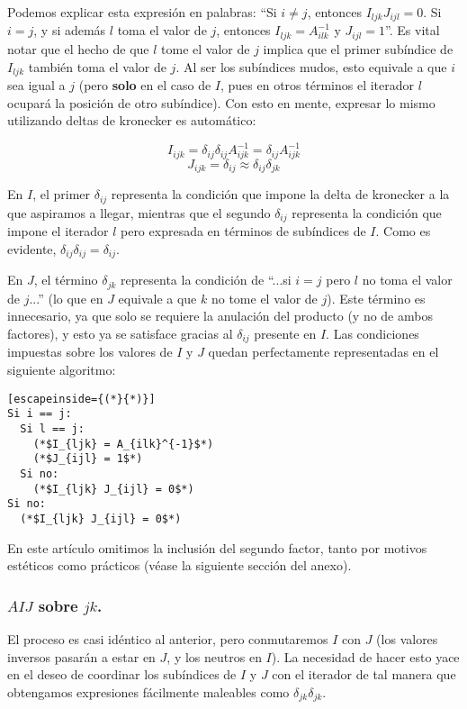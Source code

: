 Podemos explicar esta expresión en palabras: ``Si $i \neq j$, entonces $I_{ljk} J_{ijl} = 0$. Si $i = j$, y si además $l$ toma el valor de $j$, entonces $I_{ljk} = A^{-1}_{ilk}$ y $J_{ijl} = 1$''. Es vital notar que el hecho de que $l$ tome el valor de $j$ implica que el primer subíndice de $I_{ljk}$ también toma el valor de $j$. Al ser los subíndices mudos, esto equivale a que $i$ sea igual a $j$ (pero \textbf{solo} en el caso de $I$, pues en otros términos el iterador $l$ ocupará la posición de otro subíndice). Con esto en mente, expresar lo mismo utilizando deltas de kronecker es automático:

$$I_{ijk} = \delta_{ij} \delta_{ij} A_{ijk}^{-1} = \delta_{ij} A_{ijk}^{-1}$$
$$J_{ijk} = \delta_{ij} \approx \delta_{ij} \delta_{jk}$$

En $I$, el primer $\delta_{ij}$ representa la condición que impone la delta de kronecker a la que aspiramos a llegar, mientras que el segundo $\delta_{ij}$ representa la condición que impone el iterador $l$ pero expresada en términos de subíndices de $I$. Como es evidente, $\delta_{ij} \delta_{ij} = \delta_{ij}$.

En $J$, el término $\delta_{jk}$ representa la condición de ``...si $i = j$ pero $l$ no toma el valor de $j$...'' (lo que en $J$ equivale a que $k$ no tome el valor de $j$). Este término es innecesario, ya que solo se requiere la anulación del producto (y no de ambos factores), y esto ya se satisface gracias al $\delta_{ij}$ presente en $I$. Las condiciones impuestas sobre los valores de $I$ y $J$ quedan perfectamente representadas en el siguiente algoritmo:

\begin{lstlisting}[escapeinside={(*}{*)}]
Si i == j:
  Si l == j:
    (*$I_{ljk} = A_{ilk}^{-1}$*)
    (*$J_{ijl} = 1$*)
  Si no:
    (*$I_{ljk} J_{ijl} = 0$*)
Si no:
  (*$I_{ljk} J_{ijl} = 0$*)	
\end{lstlisting}

En este artículo omitimos la inclusión del segundo factor, tanto por motivos estéticos como prácticos (véase la siguiente sección del anexo).

\subsubsection{$AIJ$ sobre $jk$.}

El proceso es casi idéntico al anterior, pero conmutaremos $I$ con $J$ (los valores inversos pasarán a estar en $J$, y los neutros en $I$). La necesidad de hacer esto yace en el deseo de coordinar los subíndices de $I$ y $J$ con el iterador de tal manera que obtengamos expresiones fácilmente maleables como $\delta_{jk} \delta_{jk}$.

